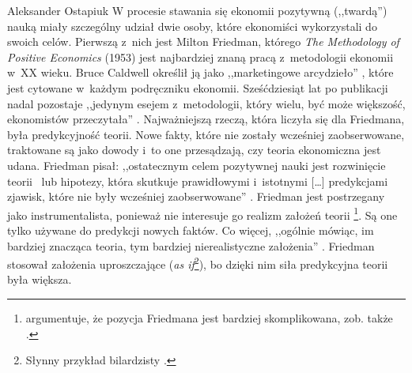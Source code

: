 \begin{artplenv}{Aleksander Ostapiuk}
W procesie stawania się ekonomii pozytywną (,,twardą'') nauką miały szczególny udział dwie osoby, które ekonomiści
wykorzystali do swoich celów. Pierwszą z~nich jest Milton Friedman, którego \textit{The Methodology of Positive
Economics} (1953) jest najbardziej znaną pracą z~metodologii ekonomii w~XX wieku. Bruce Caldwell określił ją jako
,,marketingowe arcydzieło''
\parencite[s.~173]{caldwell_beyond_1982},
które jest cytowane w~każdym podręczniku
ekonomii. Sześćdziesiąt lat po publikacji nadal pozostaje ,,jedynym esejem z~metodologii, który wielu, być może
większość, ekonomistów przeczytała''
\parencite[s.~162]{hausman_inexact_1992}.
Najważniejszą rzeczą, która
liczyła się dla Friedmana, była predykcyjność teorii. Nowe fakty, które nie zostały wcześniej zaobserwowane, traktowane są jako
dowody i~to one przesądzają, czy teoria ekonomiczna jest udana. Friedman pisał: ,,ostatecznym celem pozytywnej nauki jest
rozwinięcie \guillemotleft teorii\guillemotright
\ lub  \guillemotleft hipotezy\guillemotright, która skutkuje prawidłowymi i~istotnymi [\ldots] predykcjami zjawisk, które nie były
wcześniej zaobserwowane''
\parencite[s.~7]{friedman_essays_1953}.
Friedman jest postrzegany jako
instrumentalista, ponieważ nie interesuje go realizm założeń teorii
\parencite{boland_critique_1979,caldwell_critique_1992}\footnote{%
\parencite{maki_unrealistic_2009}
argumentuje, że pozycja Friedmana jest bardziej skomplikowana,
zob. także
\parencite{hoyningen-huene_revisiting_2017}.
}. Są one tylko używane do predykcji nowych faktów. Co
więcej, ,,ogólnie mówiąc, im bardziej znacząca teoria, tym bardziej nierealistyczne założenia''
\parencite[s.~14]{friedman_essays_1953}.
Friedman stosował założenia uproszczające (\textit{as if}\footnote{Słynny przykład bilardzisty
\parencite[s.~13]{friedman_essays_1953}.
}), bo dzięki nim siła predykcyjna teorii była większa. 


\end{artplenv}
